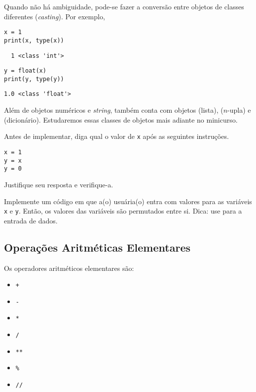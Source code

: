 \documentclass[12pt]{article}
\begin{document}
\begin{obs}
  Quando não há ambiguidade, pode-se fazer a conversão entre objetos de classes diferentes (\textit{casting}). Por exemplo,

\begin{lstlisting}
x = 1
print(x, type(x))
\end{lstlisting}

\begin{verbatim}
  1 <class 'int'>
\end{verbatim}

\begin{lstlisting}
y = float(x)
print(y, type(y))
\end{lstlisting}

\begin{verbatim}
1.0 <class 'float'>  
\end{verbatim}

\end{obs}

Além de objetos numéricos e {\it string}, {\python} também conta com objetos {\PYTHONlist} (lista), {\PYTHONtuple} ($n$-upla) e {\PYTHONdict} (dicionário). Estudaremos essas classes de objetos mais adiante no minicurso.

\begin{exr}
  Antes de implementar, diga qual o valor de \texttt{x} após as seguintes instruções.

\begin{lstlisting}
x = 1
y = x
y = 0
\end{lstlisting}

Justifique seu resposta e verifique-a.
\end{exr}

\begin{exr}
  Implemente um código em que a(o) usuária(o) entra com valores para as variáveis \texttt{x} e \texttt{y}. Então, os valores das variáveis são permutados entre si. Dica: use {\PYTHONinput} para a entrada de dados.
\end{exr}

\subsection{Operações Aritméticas Elementares}

Os operadores aritméticos elementares são:
\begin{itemize}
\item[] \lstinline-+- 
\item[] \lstinline+-+ 
\item[] \lstinline+*+ 
\item[] \lstinline+/+ 
\item[] \lstinline+**+ 
\item[] \texttt{\%} 
\item[] \lstinline+//+ 
\end{itemize}
\end{document}
